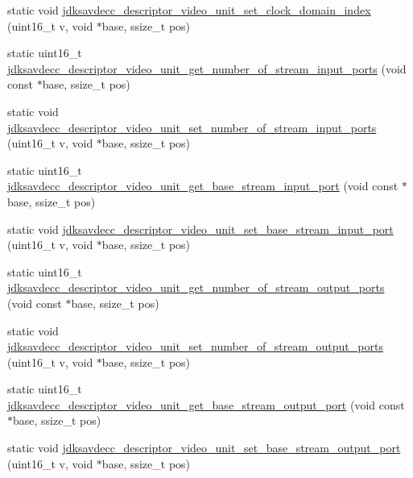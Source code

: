 \begin{DoxyCompactItemize}
\item 
static void \hyperlink{group__descriptor__video_ga1130aad26c064608acef5e32b4f069a6}{jdksavdecc\+\_\+descriptor\+\_\+video\+\_\+unit\+\_\+set\+\_\+clock\+\_\+domain\+\_\+index} (uint16\+\_\+t v, void $\ast$base, ssize\+\_\+t pos)
\item 
static uint16\+\_\+t \hyperlink{group__descriptor__video_ga415229a025c64b9593065d64d85782fe}{jdksavdecc\+\_\+descriptor\+\_\+video\+\_\+unit\+\_\+get\+\_\+number\+\_\+of\+\_\+stream\+\_\+input\+\_\+ports} (void const $\ast$base, ssize\+\_\+t pos)
\item 
static void \hyperlink{group__descriptor__video_ga8cc35afda6dea1ca2131c761b3813157}{jdksavdecc\+\_\+descriptor\+\_\+video\+\_\+unit\+\_\+set\+\_\+number\+\_\+of\+\_\+stream\+\_\+input\+\_\+ports} (uint16\+\_\+t v, void $\ast$base, ssize\+\_\+t pos)
\item 
static uint16\+\_\+t \hyperlink{group__descriptor__video_ga27ac1cac7af1115dea1a731987f981f6}{jdksavdecc\+\_\+descriptor\+\_\+video\+\_\+unit\+\_\+get\+\_\+base\+\_\+stream\+\_\+input\+\_\+port} (void const $\ast$base, ssize\+\_\+t pos)
\item 
static void \hyperlink{group__descriptor__video_gae40baa21b76cabbe5037b7511004105d}{jdksavdecc\+\_\+descriptor\+\_\+video\+\_\+unit\+\_\+set\+\_\+base\+\_\+stream\+\_\+input\+\_\+port} (uint16\+\_\+t v, void $\ast$base, ssize\+\_\+t pos)
\item 
static uint16\+\_\+t \hyperlink{group__descriptor__video_ga1952d9279403d16b51b3890d37279620}{jdksavdecc\+\_\+descriptor\+\_\+video\+\_\+unit\+\_\+get\+\_\+number\+\_\+of\+\_\+stream\+\_\+output\+\_\+ports} (void const $\ast$base, ssize\+\_\+t pos)
\item 
static void \hyperlink{group__descriptor__video_ga2d9888609972ad47801c552e82b56475}{jdksavdecc\+\_\+descriptor\+\_\+video\+\_\+unit\+\_\+set\+\_\+number\+\_\+of\+\_\+stream\+\_\+output\+\_\+ports} (uint16\+\_\+t v, void $\ast$base, ssize\+\_\+t pos)
\item 
static uint16\+\_\+t \hyperlink{group__descriptor__video_gaa459170e0f0d74d9a0d9e6450f0f648f}{jdksavdecc\+\_\+descriptor\+\_\+video\+\_\+unit\+\_\+get\+\_\+base\+\_\+stream\+\_\+output\+\_\+port} (void const $\ast$base, ssize\+\_\+t pos)
\item 
static void \hyperlink{group__descriptor__video_gab464b49f8d437e0d210495ed4c35e7b4}{jdksavdecc\+\_\+descriptor\+\_\+video\+\_\+unit\+\_\+set\+\_\+base\+\_\+stream\+\_\+output\+\_\+port} (uint16\+\_\+t v, void $\ast$base, ssize\+\_\+t pos)
\item 

\end{DoxyCompactItemize}
